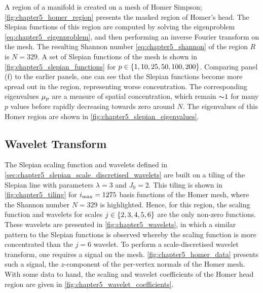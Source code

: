 A region of a manifold is created on a mesh of Homer Simpson; \cref{fig:chapter5_homer_region} presents the masked region of Homer's head.
The Slepian functions of this region are computed by solving the eigenproblem \cref{eq:chapter5_eigenproblem}, and then performing an inverse Fourier transform on the mesh.
The resulting Shannon number \cref{eq:chapter5_shannon} of the region \(R\) is \(N=329\).
A set of Slepian functions of the mesh is shown in \cref{fig:chapter5_slepian_functions} for \(p \in \{1, 10, 25, 50, 100, 200\}\).
Comparing panel (f) to the earlier panels, one can see that the Slepian functions become more spread out in the region, representing worse concentration.
The corresponding eigenvalues \({\mu}_{p}\) are a measure of spatial concentration, which remain \({\thicksim}\num{1}\) for many \(p\) values before rapidly decreasing towards zero around \(N\).
The eigenvalues of this Homer region are shown in \cref{fig:chapter5_slepian_eigenvalues}.







\subsection{Wavelet Transform}\label{sec:chapter5_wavelet_transform}

The Slepian scaling function and wavelets defined in \cref{sec:chapter5_slepian_scale_discretised_wavelets} are built on a tiling of the Slepian line with parameters \(\lambda=3\) and \(J_{0}=2\).
This tiling is shown in \cref{fig:chapter5_tiling} for \(i_{\text{max}}=\num{1275}\) basis functions of the Homer mesh, where the Shannon number \(N=329\) is highlighted.
Hence, for this region, the scaling function and wavelets for scales \(j \in \{2, 3, 4, 5, 6\}\) are the only non-zero functions.
These wavelets are presented in \cref{fig:chapter5_wavelets}, in which a similar pattern to the Slepian functions is observed whereby the scaling function is more concentrated than the \(j=6\) wavelet.
To perform a scale-discretised wavelet transform, one requires a signal on the mesh.
\cref{fig:chapter5_homer_data} presents such a signal, the \(z\)-component of the per-vertex normals of the Homer mesh.
With some data to hand, the scaling and wavelet coefficients of the Homer head region are given in \cref{fig:chapter5_wavelet_coefficients}.


